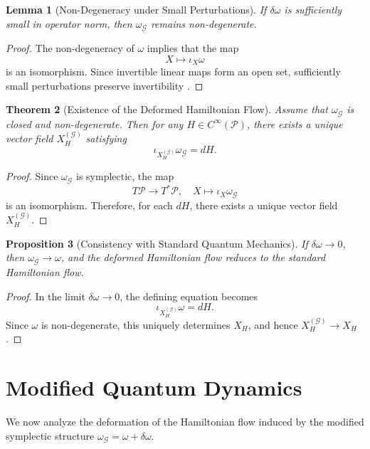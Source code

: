\documentclass[11pt, a4paper]{article}
\newtheorem{theorem}{Theorem}[section]
\newtheorem{lemma}[theorem]{Lemma}
\newtheorem{proposition}[theorem]{Proposition}
\begin{document}
\begin{lemma}[Non-Degeneracy under Small Perturbations]
If $\delta\omega$ is sufficiently small in operator norm, then
$\omega_{\mathcal{G}}$ remains non-degenerate.
\end{lemma}

\begin{proof}
The non-degeneracy of $\omega$ implies that the map
\[
X \mapsto \iota_X \omega
\]
is an isomorphism. Since invertible linear maps form an open set,
sufficiently small perturbations preserve invertibility \cite{deGosson2011}.
\end{proof}

\begin{theorem}[Existence of the Deformed Hamiltonian Flow]
Assume that $\omega_{\mathcal{G}}$ is closed and non-degenerate.
Then for any $H \in C^\infty(\mathcal{P})$, there exists a unique vector field
$X_H^{(\mathcal{G})}$ satisfying
\[
\iota_{X_H^{(\mathcal{G})}} \omega_{\mathcal{G}} = dH.
\]
\end{theorem}

\begin{proof}
Since $\omega_{\mathcal{G}}$ is symplectic, the map
\[
T\mathcal{P} \to T^*\mathcal{P}, \quad X \mapsto \iota_X \omega_{\mathcal{G}}
\]
is an isomorphism. Therefore, for each $dH$, there exists a unique
vector field $X_H^{(\mathcal{G})}$.
\end{proof}

\begin{proposition}[Consistency with Standard Quantum Mechanics]
If $\delta\omega \to 0$, then $\omega_{\mathcal{G}} \to \omega$, and the
deformed Hamiltonian flow reduces to the standard Hamiltonian flow.
\end{proposition}

\begin{proof}
In the limit $\delta\omega \to 0$, the defining equation becomes
\[
\iota_{X_H^{(\mathcal{G})}} \omega = dH.
\]
Since $\omega$ is non-degenerate, this uniquely determines $X_H$,
and hence $X_H^{(\mathcal{G})} \to X_H$ \cite{dirac1958}.
\end{proof}


\section{Modified Quantum Dynamics}

We now analyze the deformation of the Hamiltonian flow induced by the
modified symplectic structure $\omega_{\mathcal{G}} = \omega + \delta\omega$.
\end{document}
